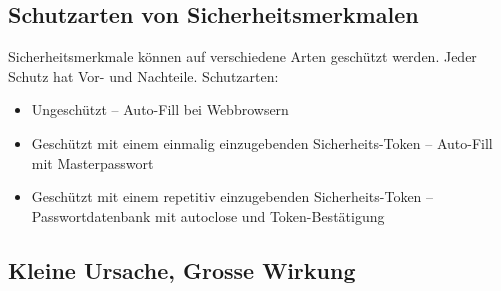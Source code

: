 \documentclass[a4paper,12pt]{article}
\begin{document}
\subsection{Schutzarten von Sicherheitsmerkmalen}
Sicherheitsmerkmale können auf verschiedene Arten geschützt werden. Jeder Schutz hat Vor- und Nachteile. Schutzarten:
\begin{itemize}
\item Ungeschützt -- Auto-Fill bei Webbrowsern
\item Geschützt mit einem einmalig einzugebenden Sicherheits-Token -- Auto-Fill mit Masterpasswort
\item Geschützt mit einem repetitiv einzugebenden Sicherheits-Token -- Passwortdatenbank mit autoclose und Token-Bestätigung
\end{itemize}

\subsection{Kleine Ursache, Grosse Wirkung}
\end{document}
